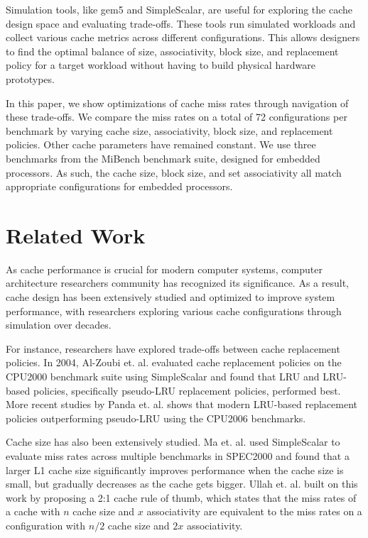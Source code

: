 \documentclass[conference]{IEEEtran}
\begin{document}
Simulation tools, like gem5\cite{10.1145/2024716.2024718} and SimpleScalar\cite{10.1145/268806.268810}, are useful for exploring the cache design space and evaluating trade-offs. These tools run simulated workloads and collect various cache metrics across different configurations. This allows designers to find the optimal balance of size, associativity, block size, and replacement policy for a target workload without having to build physical hardware prototypes.

In this paper, we show optimizations of cache miss rates through navigation of these trade-offs. We compare the miss rates on a total of 72 configurations per benchmark by varying cache size, associativity, block size, and replacement policies. Other cache parameters have remained constant. We use three benchmarks from the MiBench benchmark suite, designed for embedded processors. As such, the cache size, block size, and set associativity all match appropriate configurations for embedded processors.

\section{Related Work}

As cache performance is crucial for modern computer systems, computer architecture researchers community has recognized its significance. As a result, cache design has been extensively studied and optimized to improve system performance, with researchers exploring various cache configurations through simulation over decades.

For instance, researchers have explored trade-offs between cache replacement policies. In 2004, Al-Zoubi et. al.\cite{10.1145/986537.986601} evaluated cache replacement policies on the CPU2000 benchmark suite using SimpleScalar and found that LRU and LRU-based policies, specifically pseudo-LRU replacement policies, performed best. More recent studies by Panda et. al.\cite{7806218} shows that modern LRU-based replacement policies outperforming pseudo-LRU using the CPU2006 benchmarks.

Cache size has also been extensively studied. Ma et. al.\cite{5260945} used SimpleScalar to evaluate miss rates across multiple benchmarks in SPEC2000 and found that a larger L1 cache size significantly improves performance when the cache size is small, but gradually decreases as the cache gets bigger. Ullah et. al.\cite{8975563} built on this work by proposing a 2:1 cache rule of thumb, which states that the miss rates of a cache with $n$ cache size and $x$ associativity are equivalent to the miss rates on a configuration with $n/2$ cache size and $2x$ associativity.
\end{document}
